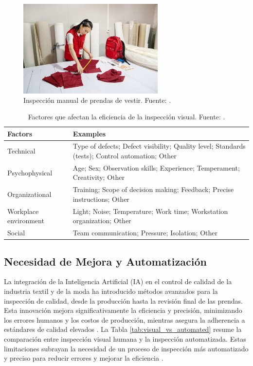 \begin{figure}[H]
	\centering
	\includegraphics[width=0.65\textwidth]{img/insp_manual.jpg}
	\caption[Inspección manual de prendas de vestir.]{Inspección manual de prendas de vestir. Fuente: \cite{qimaProcedimientosInspeccin}.}
	\label{fig:insp_manual}
\end{figure}

\begin{table}[H]
	\centering
	\caption[Factores que afectan la eficiencia de la inspección visual.]{Factores que afectan la eficiencia de la inspección visual. Fuente: \cite{KujawinskaVogt2015}.}
	\begin{tabular}{|p{10em}|p{18em}|}
		\hline
		\textbf{Factors} & \textbf{Examples} \bigstrut\\
		\hline
		Technical & {Type of defects; Defect visibility; Quality level; Standards (tests); Control automation;  Other} \bigstrut\\
		\hline
		Psychophysical & Age;  Sex;  Observation  skills;  Experience;  Temperament;  Creativity;  Other \bigstrut\\
		\hline
		Organizational & Training;  Scope  of  decision  making; Feedback;  Precise  instructions;  Other \bigstrut\\
		\hline
		Workplace environment & {Light; Noise; Temperature; Work time; Workstation organization; Other} \bigstrut\\
		\hline
		Social & {Team communication;  Pressure;  Isolation; Other} \bigstrut\\
		\hline
	\end{tabular}%
	\label{tab:eficiencia_inspección}%
\end{table}%

\subsection*{Necesidad de Mejora y Automatización}

La integración de la Inteligencia Artificial (IA) en el control de calidad de la industria textil y de la moda ha introducido métodos avanzados para la inspección de calidad, desde la producción hasta la revisión final de las prendas. Esta innovación mejora significativamente la eficiencia y precisión, minimizando los errores humanos y los costos de producción, mientras asegura la adherencia a estándares de calidad elevados \cite{TextileLearner}. La Tabla \ref{tab:visual_vs_automated} resume la comparación entre inspección visual humana y la inspección automatizada. Estas limitaciones subrayan la necesidad de un proceso de inspección más automatizado y preciso para reducir errores y mejorar la eficiencia \cite{Islam2006ASuitable}.

